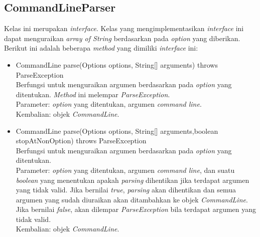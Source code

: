 \subsection{CommandLineParser}
\label{subsec:commandlineparser}
Kelas ini merupakan \textit{interface}. Kelas yang mengimplementasikan \textit{interface} ini dapat menguraikan \textit{array of String} berdasarkan pada \textit{option} yang diberikan. Berikut ini adalah beberapa \textit{method} yang dimiliki \textit{interface} ini: 
\begin{itemize}
\item CommandLine parse(Options options, String[] arguments) throws ParseException\\
Berfungsi untuk menguraikan argumen berdasarkan pada \textit{option} yang ditentukan. \textit{Method} ini melempar \textit{ParseException}.\\
Parameter: \textit{option} yang ditentukan, argumen \textit{command line}.\\
Kembalian: objek \textit{CommandLine}.

\item CommandLine parse(Options options, String[] arguments,boolean stopAtNonOption) throws ParseException\\
Berfungsi untuk menguraikan argumen berdasarkan pada \textit{option} yang ditentukan.\\
Parameter: \textit{option} yang ditentukan, argumen \textit{command line}, dan suatu \textit{boolean} yang menentukan apakah \textit{parsing} dihentikan jika terdapat argumen yang tidak valid. Jika bernilai \textit{true}, \textit{parsing} akan dihentikan dan semua argumen yang sudah diuraikan akan ditambahkan ke objek \textit{CommandLine}. Jika bernilai \textit{false}, akan dilempar \textit{ParseException} bila terdapat argumen yang tidak valid.
\\
Kembalian: objek \textit{CommandLine}.
\end{itemize}

